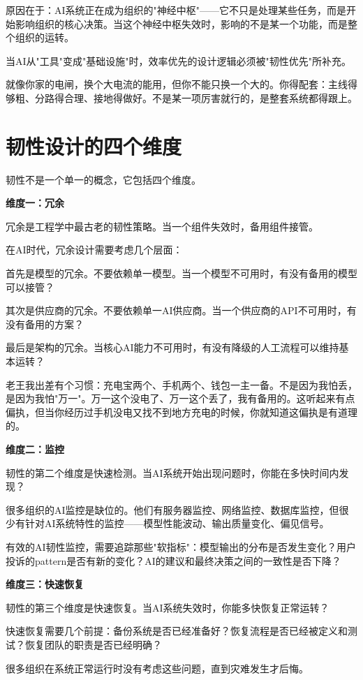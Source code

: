 原因在于：AI系统正在成为组织的"神经中枢"——它不只是处理某些任务，而是开始影响组织的核心决策。当这个神经中枢失效时，影响的不是某一个功能，而是整个组织的运转。

当AI从"工具"变成"基础设施"时，效率优先的设计逻辑必须被"韧性优先"所补充。

就像你家的电闸，换个大电流的能用，但你不能只换一个大的。你得配套：主线得够粗、分路得合理、接地得做好。不是某一项厉害就行的，是整套系统都得跟上。

\section{韧性设计的四个维度}


韧性不是一个单一的概念，它包括四个维度。

\textbf{维度一：冗余}

冗余是工程学中最古老的韧性策略。当一个组件失效时，备用组件接管。

在AI时代，冗余设计需要考虑几个层面：

首先是模型的冗余。不要依赖单一模型。当一个模型不可用时，有没有备用的模型可以接管？

其次是供应商的冗余。不要依赖单一AI供应商。当一个供应商的API不可用时，有没有备用的方案？

最后是架构的冗余。当核心AI能力不可用时，有没有降级的人工流程可以维持基本运转？

老王我出差有个习惯：充电宝两个、手机两个、钱包一主一备。不是因为我怕丢，是因为我怕"万一"。万一这个没电了、万一这个丢了，我有备用的。这听起来有点偏执，但当你经历过手机没电又找不到地方充电的时候，你就知道这偏执是有道理的。

\textbf{维度二：监控}

韧性的第二个维度是快速检测。当AI系统开始出现问题时，你能在多快时间内发现？

很多组织的AI监控是缺位的。他们有服务器监控、网络监控、数据库监控，但很少有针对AI系统特性的监控——模型性能波动、输出质量变化、偏见信号。

有效的AI韧性监控，需要追踪那些"软指标"：模型输出的分布是否发生变化？用户投诉的pattern是否有新的变化？AI的建议和最终决策之间的一致性是否下降？

\textbf{维度三：快速恢复}

韧性的第三个维度是快速恢复。当AI系统失效时，你能多快恢复正常运转？

快速恢复需要几个前提：备份系统是否已经准备好？恢复流程是否已经被定义和测试？恢复团队的职责是否已经明确？

很多组织在系统正常运行时没有考虑这些问题，直到灾难发生才后悔。

